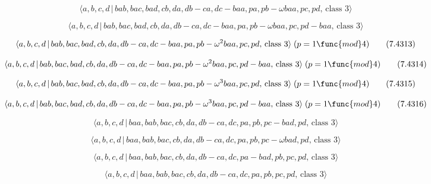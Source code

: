 \documentclass[10pt]{article}
\begin{document}
\begin{equation}
\langle a,b,c,d\,|\,bab,bac,bad,cb,da,db-ca,dc-baa,pa,pb-\omega baa,pc,pd,\,%
\text{class }3\rangle  \tag{7.4311}
\end{equation}

\begin{equation}
\langle a,b,c,d\,|\,bab,bac,bad,cb,da,db-ca,dc-baa,pa,pb-\omega
baa,pc,pd-baa,\,\text{class }3\rangle  \tag{7.4312}
\end{equation}

\begin{equation}
\langle a,b,c,d\,|\,bab,bac,bad,cb,da,db-ca,dc-baa,pa,pb-\omega
^{2}baa,pc,pd,\,\text{class }3\rangle \;(p=1\func{mod}4)  \tag{7.4313}
\end{equation}

\begin{equation}
\langle a,b,c,d\,|\,bab,bac,bad,cb,da,db-ca,dc-baa,pa,pb-\omega
^{2}baa,pc,pd-baa,\,\text{class }3\rangle \;(p=1\func{mod}4)  \tag{7.4314}
\end{equation}

\begin{equation}
\langle a,b,c,d\,|\,bab,bac,bad,cb,da,db-ca,dc-baa,pa,pb-\omega
^{3}baa,pc,pd,\,\text{class }3\rangle \;(p=1\func{mod}4)  \tag{7.4315}
\end{equation}

\begin{equation}
\langle a,b,c,d\,|\,bab,bac,bad,cb,da,db-ca,dc-baa,pa,pb-\omega
^{3}baa,pc,pd-baa,\,\text{class }3\rangle \;(p=1\func{mod}4)  \tag{7.4316}
\end{equation}

\begin{equation}
\langle a,b,c,d\,|\,baa,bab,bac,cb,da,db-ca,dc,pa,pb,pc-bad,pd,\,\text{class 
}3\rangle  \tag{7.4317}
\end{equation}

\begin{equation}
\langle a,b,c,d\,|\,baa,bab,bac,cb,da,db-ca,dc,pa,pb,pc-\omega bad,pd,\,%
\text{class }3\rangle  \tag{7.4318}
\end{equation}

\begin{equation}
\langle a,b,c,d\,|\,baa,bab,bac,cb,da,db-ca,dc,pa-bad,pb,pc,pd,\,\text{class 
}3\rangle  \tag{7.4319}
\end{equation}

\begin{equation}
\langle a,b,c,d\,|\,baa,bab,bac,cb,da,db-ca,dc,pa,pb,pc,pd,\,\text{class }%
3\rangle  \tag{7.4320}
\end{equation}
\end{document}
